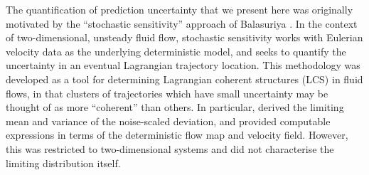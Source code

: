 The quantification of prediction uncertainty that we present here was originally motivated by the ``stochastic sensitivity'' approach of Balasuriya \cite{Balasuriya_2020_StochasticSensitivityComputable}.
In the context of two-dimensional, unsteady fluid flow, stochastic sensitivity works with Eulerian velocity data as the underlying deterministic model, and seeks to quantify the uncertainty in an eventual Lagrangian trajectory location.
This methodology was developed as a tool for determining Lagrangian coherent structures (LCS) \cite{BalasuriyaEtAl_2018_GeneralizedLagrangianCoherent,HadjighasemEtAl_2017_CriticalComparisonLagrangian} in fluid flows, in that clusters of trajectories which have small uncertainty may be thought of as more ``coherent'' than others.  
In particular, \cite{Balasuriya_2020_StochasticSensitivityComputable} derived the limiting mean and variance of the noise-scaled deviation, and provided computable expressions in terms of the deterministic flow map and velocity field.
However, this was restricted to two-dimensional systems and did not characterise the limiting distribution itself.



